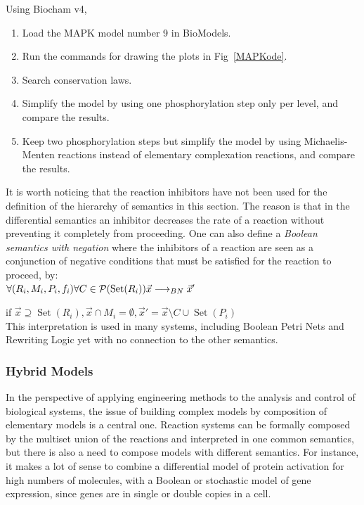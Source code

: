 \documentclass[graybox]{svmult}
\newcommand{\lra}{\longrightarrow}
\DeclareMathOperator{\Set}{Set}
\begin{document}
\begin{exercise} Using Biocham v4,
  \begin{enumerate}
  \item Load the MAPK model number 9 in BioModels.
  \item Run the commands for drawing the plots in Fig~\ref{MAPKode}.
  \item Search conservation laws.
  \item Simplify the model by using one phosphorylation step only per level, and compare the results.
    \item Keep two phosphorylation steps but simplify the model by using Michaelis-Menten reactions instead of elementary complexation reactions, and compare the results.
    \end{enumerate}
\end{exercise}


It is worth noticing that the reaction inhibitors have not been used for the definition of the hierarchy of semantics in this section.
The reason is that in the differential semantics an inhibitor decreases the rate of a reaction without preventing it completely from proceeding.
One can also define a \emph{Boolean semantics with negation}
where the inhibitors of a reaction are seen as a conjunction of negative conditions that must be satisfied for the reaction to proceed,
by:\\
$\forall (R_i, M_i, P_i, f_i) \forall C\in{\cal P}(\Set(R_i)) {\vec       x}\lra_{BN}{\vec x'}$

\hfill if ${\vec x}\supseteq \Set(R_i), {\vec x}\cap M_i=\emptyset, {\vec x'} =       {\vec x} \setminus C \cup \Set(P_i)$\\
This interpretation is used in many systems, including Boolean Petri Nets
and Rewriting Logic \cite{EKLLMS02psb} yet with no connection to the other semantics.

\subsubsection{Hybrid Models}

In the perspective of applying engineering methods to
the analysis and control of biological systems, the issue of building complex models
by composition of elementary models is a central one.
Reaction systems can be formally composed by the multiset union of the reactions
and interpreted in one common semantics,
but there is also a need to compose models with different semantics.
For instance, it makes a lot of sense to combine 
a differential model of protein activation for high numbers of molecules,
with a Boolean or stochastic model of gene expression,
since genes are in single or double copies in a cell. %
\end{document}
